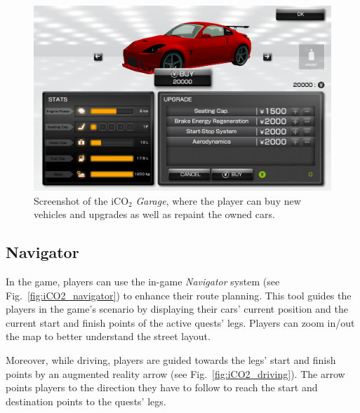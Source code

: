 \documentclass[preprint,authoryear,12pt]{elsarticle}
\begin{document}
\begin{figure}[htb]
\begin{center}
\includegraphics[width=.80\linewidth]{ijhcs14-img/iCO2_garage}
\caption{Screenshot of the iCO$_2$ \textit{Garage}, where the player can buy new vehicles and upgrades as well as repaint the owned cars.\label{fig:iCO2_garage}}
\end{center}
\end{figure}

\subsection{Navigator}

In the game, players can use the in-game \textit{Navigator} system (see Fig.~\ref{fig:iCO2_navigator}) to enhance their route planning. This tool guides the players in the game's scenario by displaying their cars' current position and the current start and finish points of the active quests' legs. Players can zoom in/out the map to better understand the street layout.

Moreover, while driving, players are guided towards the legs' start and finish points by an augmented reality arrow (see Fig.~\ref{fig:iCO2_driving}). The arrow points players to the direction they have to follow to reach the start and destination points to the quests' legs.
\end{document}
